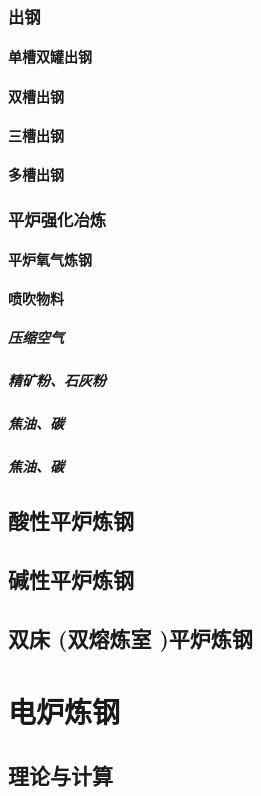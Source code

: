 \documentclass[UTF8]{../../ApplicationUniverse}
\begin{document}
        \subsubsection{出钢}
            \paragraph{单槽双罐出钢}
            \paragraph{双槽出钢}
            \paragraph{三槽出钢}
            \paragraph{多槽出钢}
        \subsubsection{平炉强化冶炼}
            \paragraph{平炉氧气炼钢}
            \paragraph{喷吹物料}
                \subparagraph{压缩空气}
                \subparagraph{精矿粉、石灰粉}
                \subparagraph{焦油、碳}
                \subparagraph{焦油、碳}
    \subsection{酸性平炉炼钢}
    \subsection{碱性平炉炼钢}
    \subsection{双床 (双熔炼室 )平炉炼钢}
\section{电炉炼钢}
    \subsection{理论与计算}
\end{document}
